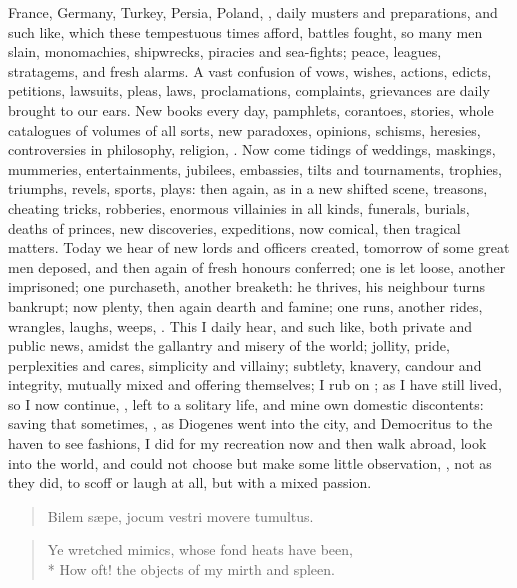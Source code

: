 {France, Germany, Turkey, Persia, Poland, \etc, daily musters and
preparations, and such like, which these tempestuous times afford,
battles fought, so many men slain, monomachies, shipwrecks, piracies
and sea-fights; peace, leagues, stratagems, and fresh alarms. A vast
confusion of vows, wishes, actions, edicts, petitions, lawsuits, pleas,
laws, proclamations, complaints, grievances are daily brought to our
ears. New books every day, pamphlets, corantoes, stories, whole
catalogues of volumes of all sorts, new paradoxes, opinions, schisms,
heresies, controversies in philosophy, religion, \etc. Now come tidings
of weddings, maskings, mummeries, entertainments, jubilees, embassies,
tilts and tournaments, trophies, triumphs, revels, sports, plays: then
again, as in a new shifted scene, treasons, cheating tricks, robberies,
enormous villainies in all kinds, funerals, burials, deaths of princes,
new discoveries, expeditions, now comical, then tragical matters. Today
we hear of new lords and officers created, tomorrow of some great men
deposed, and then again of fresh honours conferred; one is let loose,
another imprisoned; one purchaseth, another breaketh: he thrives, his
neighbour turns bankrupt; now plenty, then again dearth and famine; one
runs, another rides, wrangles, laughs, weeps, \etc. This I daily hear,
and such like, both private and public news, amidst the gallantry and
misery of the world; jollity, pride, perplexities and cares, simplicity
and villainy; subtlety, knavery, candour and integrity, mutually mixed
and offering themselves; I rub on ; as I have still
lived, so I now continue, , left to a solitary life, and
mine own domestic discontents: saving that sometimes, ,
as Diogenes went into the city, and Democritus to the haven to see
fashions, I did for my recreation now and then walk abroad, look into
the world, and could not choose but make some little observation, , not as they did, to
scoff or laugh at all, but with a mixed passion.

\begin{verse}
\textlatin{Bilem s\ae{}pe, jocum vestri movere tumultus}.
\end{verse}

\begin{verse}
Ye wretched mimics, whose fond heats have been,\\*
How oft! the objects of my mirth and spleen.
\end{verse}

}
